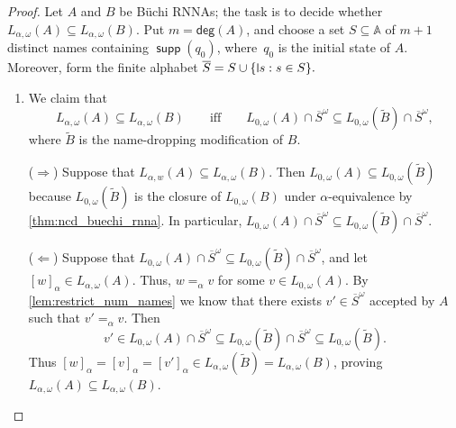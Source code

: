 \documentclass[10pt,a4paper]{amsart}
\newcommand{\midmid}{\hspace{0.2ex}{\rule[-0.1ex]{0.6pt}{1.65ex}}\hspace{0.2ex}}
\newcommand{\compr}{:}
\newcommand{\newletter}[1]{{\midmid}#1}
\newcommand{\degree}{\mathsf{deg}}
\numberwithin{equation}{section}
\newcommand{\ol}{\overline}
\newcommand{\seq}{\subseteq}
\newcommand{\tl}{\widetilde}
\newcommand{\+}[1]{\mathcal{#1}\xspace}
\newcommand{\names}{\mathbb{A}}
\DeclareMathOperator{\supp}{\mathsf{supp}} %
\theoremstyle{definition}
\begin{document}
%
\begin{proof}
  Let $A$ and $B$ be Büchi RNNAs; the task is to decide whether $L_{\alpha,\omega}(A)\seq L_{\alpha,\omega}(B)$. Put $m=\degree(A)$, and choose a set
  $S\seq \names$ of $m+1$ distinct names containing $\supp(q_{0})$, where~$q_0$ is the initial state of $A$. Moreover,
 form the finite alphabet
$
    \ol{S}=S\cup \{\newletter s\compr s\in S\}.
$ 
  \begin{enumerate}
  \item We claim that
    \begin{equation}\label{eq:acc_equiv} L_{\alpha,\omega}(A)\seq
      L_{\alpha,\omega}(B)\qquad\text{iff}\qquad L_{0,\omega}(A)\cap
      \ol{S}^\omega \seq L_{0,\omega}(\tl{B})\cap
      \ol{S}^\omega, \end{equation}
    where $\tl{B}$ is the name-dropping modification of $B$.

    \smallskip\noindent ($\Rightarrow$) Suppose that
    $L_{\alpha,w}(A)\seq L_{\alpha,\omega}(B)$. Then
    $L_{0,\omega}(A)\seq L_{0,\omega}(\tl{B})$ because
    $L_{0,\omega}(\tl{B})$ is the closure of $L_{0,\omega}(B)$ under
    $\alpha$-equivalence by \autoref{thm:ncd_buechi_rnna}. In
    particular,
    $L_{0,\omega}(A)\cap \ol{S}^\omega \seq L_{0,\omega}(\tl{B})\cap
    \ol{S}^\omega$.

    \smallskip\noindent ($\Leftarrow$) Suppose that
    $L_{0,\omega}(A)\cap \ol{S}^\omega \seq L_{0,\omega}(\tl{B})\cap
    \ol{S}^\omega$, and let $[w]_\alpha \in
    L_{\alpha,\omega}(A)$. Thus, $w=_\alpha v$ for some
    $v\in L_{0,\omega}(A)$. By \autoref{lem:restrict_num_names} we
    know that there exists $v'\in \ol{S}^\omega$ accepted by $A$ such
    that $v'=_\alpha v$. Then
    \[
      v'\in L_{0,\omega}(A)\cap \ol{S}^\omega \seq
      L_{0,\omega}(\tl{B})\cap \ol{S}^\omega \seq
      L_{0,\omega}(\tl{B}).
    \]
    Thus
    $[w]_\alpha=[v]_\alpha = [v']_\alpha \in
    L_{\alpha,\omega}(\tl{B})=L_{\alpha,\omega}(B)$, proving
    $L_{\alpha,\omega}(A)\seq L_{\alpha,\omega}(B)$.


\end{enumerate}
\end{proof}
\end{document}
